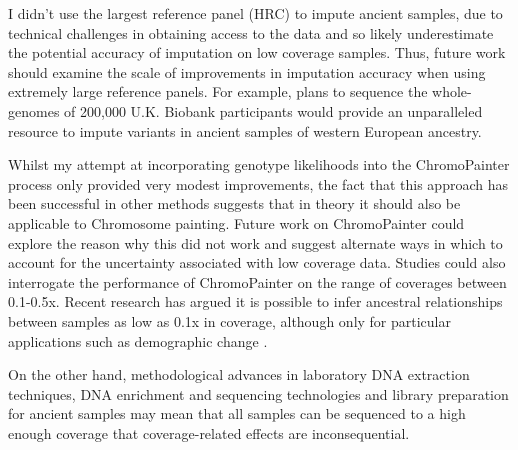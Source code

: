 I didn't use the largest reference panel (HRC) to impute ancient samples, due to technical challenges in obtaining access to the data and so likely underestimate the potential accuracy of imputation on low coverage samples. Thus, future work should examine the scale of improvements in imputation accuracy when using extremely large reference panels. For example, plans to sequence the whole-genomes of 200,000 U.K. Biobank participants would provide an unparalleled resource to impute variants in ancient samples of western European ancestry. 

Whilst my attempt at incorporating genotype likelihoods into the ChromoPainter process only provided very modest improvements, the fact that this approach has been successful in other methods \cite{ngsLD, vieira2016estimating, Meisner719, Lipatov023374} suggests that in theory it should also be applicable to Chromosome painting. Future work on ChromoPainter could explore the reason why this did not work and suggest alternate ways in which to account for the uncertainty associated with low coverage data. Studies could also interrogate the performance of ChromoPainter on the range of coverages between 0.1-0.5x. Recent research has argued it is possible to infer ancestral relationships between samples as low as 0.1x in coverage, although only for particular applications such as demographic change \cite{colate}.

On the other hand, methodological advances in laboratory DNA extraction techniques, DNA enrichment and sequencing technologies and library preparation for ancient samples may mean that all samples can be sequenced to a high enough coverage that coverage-related effects are inconsequential. 




